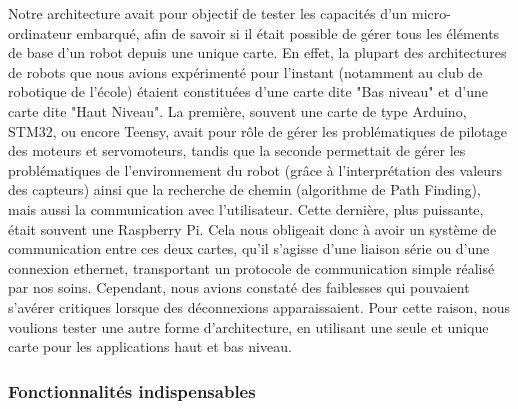 \documentclass{report}
\begin{document}
    {Notre architecture avait pour objectif de tester les capacités d'un
    micro-ordinateur embarqué, afin de savoir si il était possible de gérer
    tous les éléments de base d'un robot depuis une unique carte. En effet,
    la plupart des architectures de robots que nous avions expérimenté pour l'instant
    (notamment au club de robotique de l'école) étaient constituées d'une carte
    dite "Bas niveau" et d'une carte dite "Haut Niveau". La première, souvent une carte
    de type Arduino, STM32, ou encore Teensy, avait pour rôle de gérer les
    problématiques de pilotage des moteurs et servomoteurs, tandis que la seconde
    permettait de gérer les problématiques de l'environnement du robot (grâce à l'interprétation
    des valeurs des capteurs) ainsi que la recherche de chemin (algorithme de Path Finding),
    mais aussi la communication avec l'utilisateur. Cette dernière, plus puissante,
    était souvent une Raspberry Pi. Cela nous obligeait donc à avoir
    un système de communication entre ces deux cartes, qu'il s'agisse d'une liaison série
    ou d'une connexion ethernet, transportant un protocole de communication simple réalisé
    par nos soins. Cependant, nous avions constaté des faiblesses qui pouvaient s'avérer
    critiques lorsque des déconnexions apparaissaient. Pour cette raison, nous voulions
    tester une autre forme d'architecture, en utilisant une seule et unique carte pour
    les applications haut et bas niveau.}

    \subsubsection{Fonctionnalités indispensables}
\end{document}
